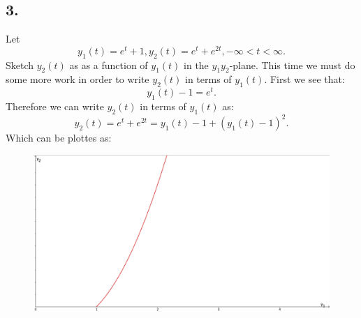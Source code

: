 \subsection*{3.} Let
\[ 
y_1(t) = e^{t} + 1, y_2(t) = e^{t} + e^{2t}, -\infty < t < \infty 
.\]
Sketch $y_2(t)$ as as a function of $y_1(t)$ in the $y_1y_2$-plane.
\bigbreak
This time we must do some more work in order to write $y_2(t)$ in terms of $y_1(t)$. First we see that:
\[ 
y_1(t) - 1 = e^{t}
.\]
Therefore we can write $y_2(t)$ in terms of $y_1(t)$ as:
\[ 
y_2(t) = e^{t} + e^{2t} = y_1(t) - 1 + \left( y_1(t) - 1 \right)^2
.\]
Which can be plottes as:
\begin{figure} [ht]
  \centering
  \includegraphics[width=0.5\linewidth]{./figures/e16_3.png}
  \caption{}
  \label{fig:e16_3}
\end{figure}




